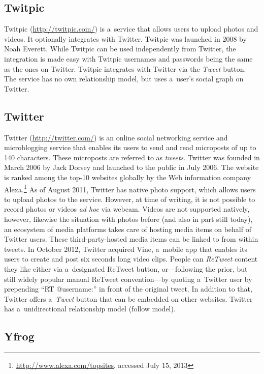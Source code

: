 \subsection{Twitpic}

Twitpic (\url{http://twitpic.com/})
is a~service that allows users to upload photos and videos.
It optionally integrates with Twitter.
Twitpic was launched in 2008 by Noah Everett.
While Twitpic can be used independently from Twitter,
the integration is made easy with Twitpic usernames and passwords
being the same as the ones on Twitter.
Twitpic integrates with Twitter via the \emph{Tweet} button.
The service has no own relationship model,
but uses a~user's social graph on Twitter.

\subsection{Twitter}
\label{sec:twitter}

Twitter (\url{http://twitter.com/})
is an online social networking service
and microblogging service
that enables its users to send and read microposts
of up to 140 characters.
These microposts are referred to as \emph{tweets}.
Twitter was founded in March 2006 by Jack Dorsey
and launched to the public in July 2006.
The website is ranked among the top-10 websites globally
by the Web information company
Alexa.\footnote{\url{http://www.alexa.com/topsites},
accessed July 15, 2013}
As of August 2011, Twitter has native photo support,
which allows users to upload photos to the service.
However, at time of writing, it is not possible to
record photos or videos \emph{ad hoc} via webcam.
Videos are not supported natively, however,
likewise the situation with photos before
(and also in part still today),
an ecosystem of media platforms takes care of
hosting media items on behalf of Twitter users.
These third-party-hosted media items
can be linked to from within tweets.
In October 2012, Twitter acquired Vine,
a~mobile app that enables its users to create
and post six seconds long video clips.
People can \emph{ReTweet} content they like either
via a~designated ReTweet button,
or---following the prior, but still widely popular
manual ReTweet convention---by
quoting a~Twitter user by prepending ``RT @username:''
in front of the original tweet.
In addition to that, Twitter offers
a~\emph{Tweet} button that can be embedded on other websites.
Twitter has a~unidirectional relationship model (follow model).

\subsection{Yfrog}

